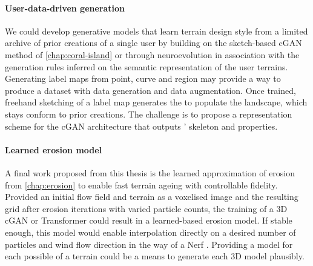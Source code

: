 \paragraph{User-data-driven generation} We could develop generative models that learn terrain design style from a limited archive of prior creations of a single user by building on the sketch-based cGAN method of \cref{chap:coral-island} or through neuroevolution \cite{Stanley2005,Cortes2024} in association with the generation rules inferred on the semantic representation of the user terrains. Generating label maps from point, curve and region  may provide a way to produce a dataset with data generation and data augmentation. Once trained, freehand sketching of a label map generates the  to populate the landscape, which stays conform to prior creations. The challenge is to propose a representation scheme for the cGAN architecture that outputs ' skeleton and properties.

\paragraph{Learned erosion model} A final work proposed from this thesis is the learned approximation of erosion from \cref{chap:erosion} to enable fast terrain ageing with controllable fidelity. Provided an initial flow field \cite{Tompson2017} and terrain as a voxelised image and the resulting grid after erosion iterations with varied particle counts, the training of a 3D cGAN \cite{Ongun2018} or Transformer \cite{Vaswani2017} could result in a learned-based erosion model. If stable enough, this model would enable interpolation directly on a desired number of particles and wind flow direction in the way of a Nerf \cite{Mildenhall2020}. Providing a model for each possible  of a terrain could be a means to generate each 3D model plausibly.







